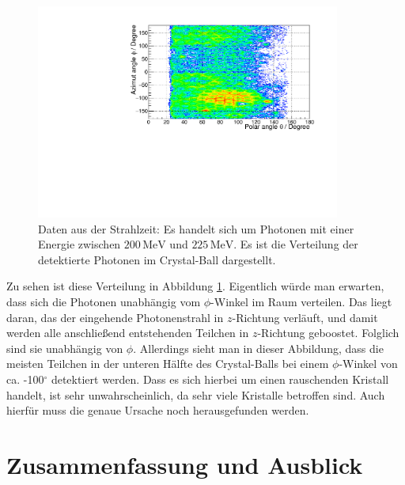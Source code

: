 \documentclass[a4paper,11pt,oneside,final,german,openbib,pdftex]{scrbook}
\begin{document}
{\begin{figure}[h!]
	\begin{center}
		\includegraphics[width=100mm]{NewCalib/ThetaPhiVerteilung/20172404ThetaPhi200MeVBeam}
		\caption[Strahlzeit: Verteilung der detektierten Photonen im CB]{Daten aus der Strahlzeit: Es handelt sich um Photonen mit einer Energie zwischen $200\,\text{MeV}$ und $225\,\text{MeV}$. Es ist die Verteilung der detektierte Photonen im Crystal-Ball dargestellt.}
		\label{fig:Verteilung-der-Photonen-im-CB}
	\end{center}
\end{figure}
Zu sehen ist diese Verteilung in Abbildung \ref{fig:Verteilung-der-Photonen-im-CB}. Eigentlich w\"urde man erwarten, dass sich die Photonen unabh\"angig vom $\phi$-Winkel im Raum verteilen. Das liegt daran, das der eingehende Photonenstrahl in $z$-Richtung verl\"auft, und damit werden alle anschlie{\ss}end entstehenden Teilchen in $z$-Richtung geboostet. Folglich sind sie unabh\"angig von $\phi$. 
Allerdings sieht man in dieser Abbildung, dass die meisten Teilchen in der unteren H\"alfte des Crystal-Balls bei einem $\phi$-Winkel von ca. -100$^{\circ}$ detektiert werden.
Dass es sich hierbei um einen rauschenden Kristall handelt, ist sehr unwahrscheinlich, da sehr viele Kristalle betroffen sind.
Auch hierf\"ur muss die genaue Ursache noch herausgefunden werden.






\chapter{Zusammenfassung und Ausblick}
\label{chap:Zusammenfassung}

}
\end{document}
